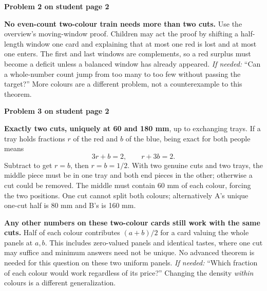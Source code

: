 \documentclass[11pt]{article}
\newcommand{\sub}[1]{\par\textbf{#1}\par}
\newcommand{\hint}[1]{\textit{If needed:} #1}
\begin{document}
\sub{Problem 2 on student page 2}
\textbf{No even-count two-colour train needs more than two cuts.} Use the overview's moving-window proof. Children may act the proof by shifting a half-length window one card and explaining that at most one red is lost and at most one enters. The first and last windows are complements, so a red surplus must become a deficit unless a balanced window has already appeared. \hint{``Can a whole-number count jump from too many to too few without passing the target?''} More colours are a different problem, not a counterexample to this theorem.

\sub{Problem 3 on student page 2}
\textbf{Exactly two cuts, uniquely at 60 and 180 mm}, up to exchanging trays. If a tray holds fractions $r$ of the red and $b$ of the blue, being exact for both people means
\[
3r+b=2,\qquad r+3b=2.
\]
Subtract to get $r=b$, then $r=b=1/2$. With two genuine cuts and two trays, the middle piece must be in one tray and both end pieces in the other; otherwise a cut could be removed. The middle must contain 60 mm of each colour, forcing the two positions. One cut cannot split both colours; alternatively A's unique one-cut half is 80 mm and B's is 160 mm.

\textbf{Any other numbers on these two-colour cards still work with the same cuts.} Half of each colour contributes $(a+b)/2$ for a card valuing the whole panels at $a,b$. This includes zero-valued panels and identical tastes, where one cut may suffice and minimum answers need not be unique. No advanced theorem is needed for this question on these two uniform panels. \hint{``Which fraction of each colour would work regardless of its price?''} Changing the density \emph{within} colours is a different generalization.
\end{document}
